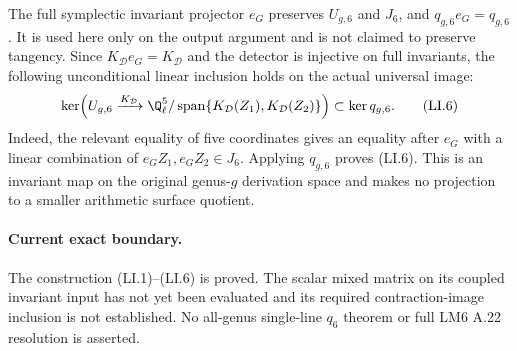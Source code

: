 The full symplectic invariant projector $e_G$ preserves
$U_{g,6}$ and $J_6$, and $q_{g,6}e_G=q_{g,6}$.
It is used here only on the output argument and is not
claimed to preserve tangency. Since $K_{\mathcal D}e_G
=K_{\mathcal D}$ and the detector is injective on full
invariants, the following unconditional linear inclusion
holds on the actual universal image:
\[
 \ker\!\left(U_{g,6}\xrightarrow{K_{\mathcal D}}
  \Q_\ell^5/\operatorname{span}\{K_{\mathcal D}(Z_1),
                                      K_{\mathcal D}(Z_2)\}\right)
                 \subset\ker q_{g,6}.                    \tag{LI.6}
\]
Indeed, the relevant equality of five coordinates gives
an equality after $e_G$ with a linear combination of
$e_GZ_1,e_GZ_2\in J_6$. Applying $q_{g,6}$ proves (LI.6).
This is an invariant map on the original genus-$g$
derivation space and makes no projection to a smaller
arithmetic surface quotient.

\paragraph{Current exact boundary.}
The construction (LI.1)--(LI.6) is proved. The scalar
mixed matrix on its coupled invariant input has not
yet been evaluated and its required contraction-image
inclusion is not established. No all-genus single-line
$q_6$ theorem or full LM6 A.22 resolution is asserted.
